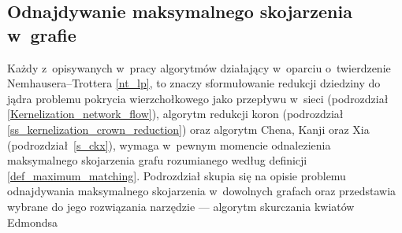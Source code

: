 \subsection{Odnajdywanie maksymalnego skojarzenia w~grafie}\label{ss_edmonds}
\par{
  Każdy z~opisywanych w~pracy algorytmów działający w~oparciu o~twierdzenie\\Nemhausera--Trottera \ref{nt_lp}, to znaczy sformułowanie redukcji dziedziny do jądra problemu pokrycia wierzchołkowego jako przepływu w~sieci (podrozdział \ref{Kernelization_network_flow}), algorytm redukcji koron (podrozdział \ref{ss_kernelization_crown_reduction}) oraz algorytm Chena, Kanji oraz Xia (podrozdział~\ref{s_ckx}), wymaga w~pewnym momencie odnalezienia maksymalnego skojarzenia grafu rozumianego według definicji \ref{def_maximum_matching}.
  Podrozdział skupia się na opisie problemu odnajdywania maksymalnego skojarzenia w~dowolnych grafach oraz przedstawia wybrane do jego rozwiązania narzędzie --- algorytm skurczania kwiatów Edmondsa
}

